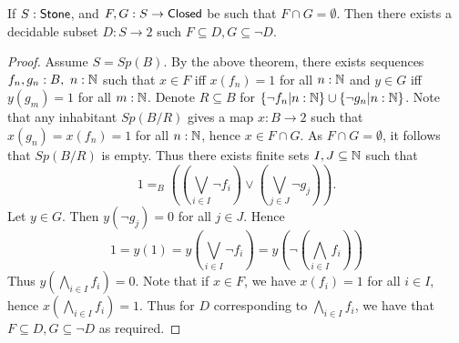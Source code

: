 \begin{lemma}\label{StoneSeperated}
  If $S:\mathsf{Stone} $, and $F,G:S \to \mathsf{Closed}$ be such that $F\cap G = \emptyset$. 
  Then there exists a decidable subset $D:S \to 2$ such $F\subseteq D, G \subseteq \neg D$. 
\end{lemma}
\begin{proof}
  Assume $S = Sp(B)$. 
  By the above theorem, there exists sequences $f_n,g_n:B,~n:\mathbb{N}$ such that 
  $x\in F$ iff $x(f_n) = 1$ for all $n:\mathbb{N}$ and 
  $y\in G$ iff $y(g_m) = 1$ for all $m:\mathbb{N}$. 
%
  Denote $R\subseteq B$ for $\{\neg f_n|n:\mathbb{N}\} \cup\{\neg g_n|n:\mathbb{N}\}$. 
  Note that any inhabitant $Sp(B/R)$ gives a map $x:B\to 2$ such that
  $x(g_n)= x(f_n) = 1$ for all $n:\mathbb{N}$, hence $x\in F \cap G$. 
  As $F\cap G = \emptyset $, it follows that $Sp(B/R)$ is empty.
%
  Thus there exists finite sets $I,J\subseteq \mathbb{N} $ such that 
  $$1 =_B ((\bigvee_{i\in I} \neg f_i) \vee (\bigvee_{j\in J} \neg g_j)).$$
%
  Let $y\in G$. Then $y(\neg g_j) = 0$ for all $j \in J$. 
  Hence 
  $$
  1 = y(1) 
  = 
  y(\bigvee_{i\in I} \neg f_i) = y (\neg (\bigwedge_{i\in I} f_i))
  $$
  Thus $y(\bigwedge_{i\in I} f_i) = 0$. 
  Note that if $x\in F$, we have $x(f_i) = 1$ for all $i\in I$, hence 
  $x(\bigwedge_{i\in I} f_i) = 1$. 
  Thus for $D$ corresponding to $\bigwedge_{i\in I} f_i$, we have that 
  $F\subseteq D, G\subseteq \neg D$ as required. 
\end{proof} 

